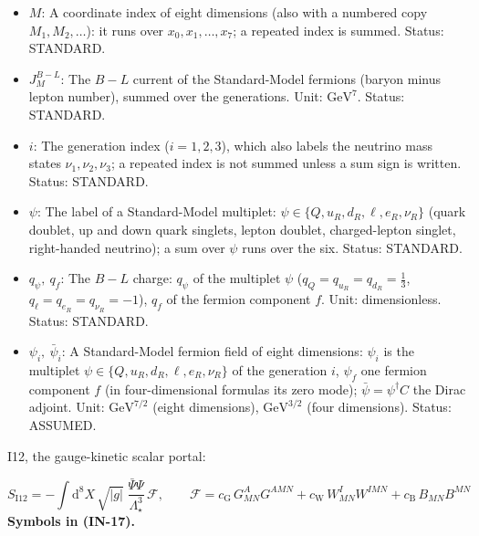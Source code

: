 \documentclass[
  10pt,
]{article}
\begin{document}
\begin{itemize}
  with a frame index are the author's real \(16 \times 16\) matrices of
  the Clifford algebra of signature \((4, 4)\);
  \(\gamma^M = \mathbf{e}_a{}^M\gamma^a\) along a coordinate
  (\(\gamma^{x_0}\), \(\gamma^{x_4}\), \ldots{} the matrices along
  \(x_0\), \(x_4\), \ldots), \(\gamma_M = g_{MN}\gamma^N\);
  \(\gamma^\mu\) the matrices of the four observable directions in
  four-dimensional formulas. Unit: dimensionless. Status: AUTHOR.
\item
  \(M\): A coordinate index of eight dimensions (also with a numbered
  copy \(M_1, M_2, \dots\)): it runs over \(x_0, x_1, \dots, x_7\); a
  repeated index is summed. Status: STANDARD.
\item
  \(J^{B-L}_M\): The \(B - L\) current of the Standard-Model fermions
  (baryon minus lepton number), summed over the generations. Unit:
  \(\mathrm{GeV}^{7}\). Status: STANDARD.
\item
  \(i\): The generation index (\(i = 1, 2, 3\)), which also labels the
  neutrino mass states \(\nu_1, \nu_2, \nu_3\); a repeated index is not
  summed unless a sum sign is written. Status: STANDARD.
\item
  \(\psi\): The label of a Standard-Model multiplet:
  \(\psi \in \{Q, u_R, d_R, \ell, e_R, \nu_R\}\) (quark doublet, up and
  down quark singlets, lepton doublet, charged-lepton singlet,
  right-handed neutrino); a sum over \(\psi\) runs over the six. Status:
  STANDARD.
\item
  \(q_\psi,\ q_f\): The \(B - L\) charge: \(q_\psi\) of the multiplet
  \(\psi\) (\(q_Q = q_{u_R} = q_{d_R} = \frac13\),
  \(q_\ell = q_{e_R} = q_{\nu_R} = -1\)), \(q_f\) of the fermion
  component \(f\). Unit: dimensionless. Status: STANDARD.
\item
  \(\psi_i,\ \bar\psi_i\): A Standard-Model fermion field of eight
  dimensions: \(\psi_i\) is the multiplet
  \(\psi \in \{Q, u_R, d_R, \ell, e_R, \nu_R\}\) of the generation
  \(i\), \(\psi_f\) one fermion component \(f\) (in four-dimensional
  formulas its zero mode); \(\bar\psi = \psi^\dagger C\) the Dirac
  adjoint. Unit: \(\mathrm{GeV}^{7/2}\) (eight dimensions),
  \(\mathrm{GeV}^{3/2}\) (four dimensions). Status: ASSUMED.
\end{itemize}

I12, the gauge-kinetic scalar portal:

\[
S_{\mathrm{I12}} = -\int\mathrm{d}^8X\,\sqrt{\lvert
 g\rvert}\;\frac{\bar\Psi\Psi}{\Lambda_\star^3}\,\mathcal{F},\qquad
\mathcal{F} = c_{\mathrm{G}}\,G^A_{MN}G^{AMN} + c_{\mathrm{W}}\,W^I_{MN}W^{IMN} +
 c_{\mathrm{B}}\,B_{MN}B^{MN} \tag{IN-17}
\] \textbf{Symbols in (IN-17).}
\end{document}

